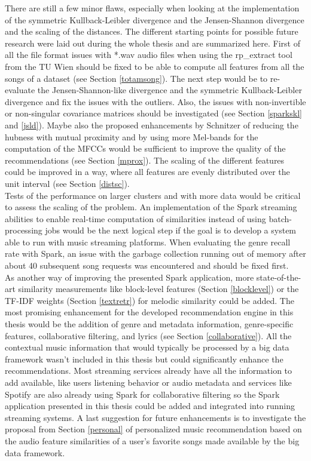 There are still a few minor flaws, especially when looking at the implementation of the symmetric Kullback-Leibler divergence and the Jensen-Shannon divergence and the scaling of the distances. The different starting points for possible future research were laid out during the whole thesis and are summarized here. First of all the file format issues with *.wav audio files when using the rp\_extract tool from the TU Wien should be fixed to be able to compute all features from all the songs of a dataset (see Section \ref{totamsong}).
The next step would be to re-evaluate the Jensen-Shannon-like divergence and the symmetric Kullback-Leibler divergence and fix the issues with the outliers. Also, the issues with non-invertible or non-singular covariance matrices should be investigated (see Section \ref{sparkskl} and \ref{jsld}). Maybe also the proposed enhancements by Schnitzer \cite{schnitzer1} of reducing the hubness with mutual proximity and by using more Mel-bands for the computation of the MFCCs would be sufficient to improve the quality of the recommendations (see Section \ref{mprox}). The scaling of the different features could be improved in a way, where all features are evenly distributed over the unit interval (see Section \ref{distsc}).\\
Tests of the performance on larger clusters and with more data would be critical to assess the scaling of the problem.
An implementation of the Spark streaming abilities to enable real-time computation of similarities instead of using batch-processing jobs would be the next logical step if the goal is to develop a system able to run with music streaming platforms. When evaluating the genre recall rate with Spark, an issue with the garbage collection running out of memory after about 40 subsequent song requests was encountered and should be fixed first.\\
\noindent As another way of improving the presented Spark application, more state-of-the-art similarity measurements like block-level features (Section \ref{blocklevel}) or the TF-IDF weights (Section \ref{textretr}) for melodic similarity could be added. The most promising enhancement for the developed recommendation engine in this thesis would be the addition of genre and metadata information, genre-specific features, collaborative filtering, and lyrics (see Section \ref{collaborative}). All the contextual music information that would typically be processed by a big data framework wasn't included in this thesis but could significantly enhance the recommendations. Most streaming services already have all the information to add available, like users listening behavior or audio metadata and services like Spotify are also already using Spark for collaborative filtering so the Spark application presented in this thesis could be added and integrated into running streaming systems. A last suggestion for future enhancements is to investigate the proposal from Section \ref{personal} of personalized music recommendation based on the audio feature similarities of a user's favorite songs made available by the big data framework.

